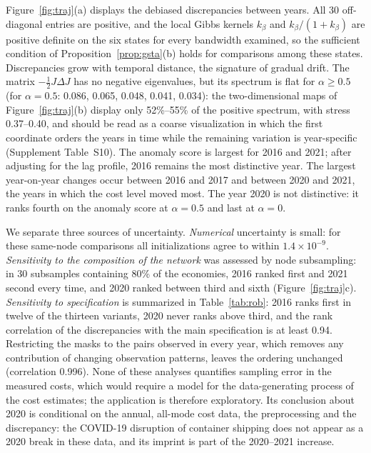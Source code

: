 \documentclass[12pt]{article}
\theoremstyle{definition}
\begin{document}
Figure~\ref{fig:traj}(a) displays the debiased discrepancies between years. All 30 off-diagonal entries are positive, and the local Gibbs kernels $k_\beta$ and $k_\beta/(1+k_\beta)$ are positive definite on the six states for every bandwidth examined, so the sufficient condition of Proposition~\ref{prop:gsta}(b) holds for comparisons among these states. Discrepancies grow with temporal distance, the signature of gradual drift. The matrix $-\frac12J\Delta J$ has no negative eigenvalues, but its spectrum is flat for $\alpha\ge0.5$ (for $\alpha=0.5$: 0.086, 0.065, 0.048, 0.041, 0.034): the two-dimensional maps of Figure~\ref{fig:traj}(b) display only 52\%--55\% of the positive spectrum, with stress 0.37--0.40, and should be read as a coarse visualization in which the first coordinate orders the years in time while the remaining variation is year-specific (Supplement Table~S10). The anomaly score is largest for 2016 and 2021; after adjusting for the lag profile, 2016 remains the most distinctive year. The largest year-on-year changes occur between 2016 and 2017 and between 2020 and 2021, the years in which the cost level moved most. The year 2020 is not distinctive: it ranks fourth on the anomaly score at $\alpha=0.5$ and last at $\alpha=0$.

We separate three sources of uncertainty. \emph{Numerical} uncertainty is small: for these same-node comparisons all initializations agree to within $1.4\times10^{-9}$. \emph{Sensitivity to the composition of the network} was assessed by node subsampling: in 30 subsamples containing 80\% of the economies, 2016 ranked first and 2021 second every time, and 2020 ranked between third and sixth (Figure~\ref{fig:traj}c). \emph{Sensitivity to specification} is summarized in Table~\ref{tab:rob}: 2016 ranks first in twelve of the thirteen variants, 2020 never ranks above third, and the rank correlation of the discrepancies with the main specification is at least 0.94. Restricting the masks to the pairs observed in every year, which removes any contribution of changing observation patterns, leaves the ordering unchanged (correlation 0.996). None of these analyses quantifies sampling error in the measured costs, which would require a model for the data-generating process of the cost estimates; the application is therefore exploratory. Its conclusion about 2020 is conditional on the annual, all-mode cost data, the preprocessing and the discrepancy: the COVID-19 disruption of container shipping \citep{notteboom2021disruptions} does not appear as a 2020 break in these data, and its imprint is part of the 2020--2021 increase.
\end{document}
